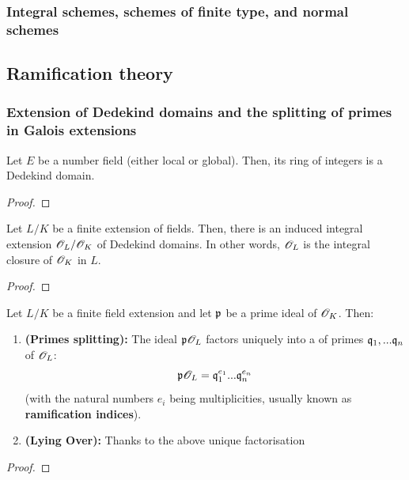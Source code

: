             \subsubsection{Integral schemes, schemes of finite type, and normal schemes}
        
        \subsection{Ramification theory}
            \subsubsection{Extension of Dedekind domains and the splitting of primes in Galois extensions}
                \begin{lemma}
                    Let $E$ be a number field (either local or global). Then, its ring of integers is a Dedekind domain. 
                \end{lemma}
                    \begin{proof}
                         
                    \end{proof}
                    
                \begin{theorem}
                    Let $L/K$ be a finite extension of fields. Then, there is an induced integral extension $\mathscr{O}_L/\mathscr{O}_K$ of Dedekind domains. In other words, $\mathscr{O}_L$ is the integral closure of $\mathscr{O}_K$ in $L$. 
                \end{theorem}
                    \begin{proof}
                        
                    \end{proof}
                \begin{corollary} \label{coro: prime_splitting_finite_extensions}
                    Let $L/K$ be a finite field extension and let $\mathfrak{p}$ be a prime ideal of $\mathscr{O}_K$. Then:
                        \begin{enumerate}
                            \item \textbf{(Primes splitting):} The ideal $\mathfrak{p}\mathscr{O}_L$ factors uniquely into a  of primes $\mathfrak{q}_1, ...\mathfrak{q}_n$ of $\mathscr{O}_L$:
                                $$\mathfrak{p}\mathscr{O}_L = \mathfrak{q}_1^{e_1}...\mathfrak{q}_n^{e_n}$$
                            (with the natural numbers $e_i$ being multiplicities, usually known as \textbf{ramification indices}).
                            \item \textbf{(Lying Over):} Thanks to the above unique factorisation 
                        \end{enumerate}
                \end{corollary}
                    \begin{proof}
                        
                    \end{proof}
                    
